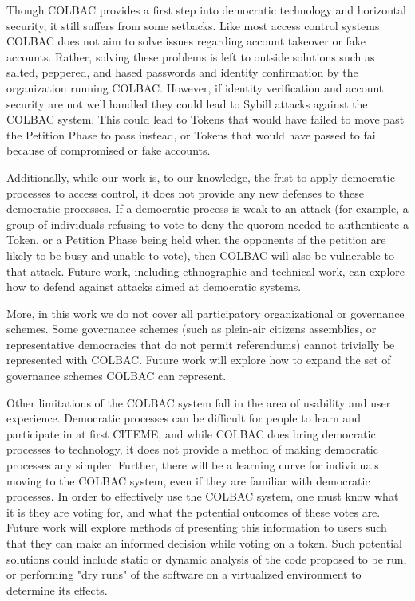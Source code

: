Though COLBAC provides a first step into democratic technology and horizontal
security, it still suffers from some setbacks. Like most access control
systems COLBAC does not aim to solve issues regarding account takeover or fake
accounts. Rather, solving these problems is left to outside solutions such as
salted, peppered, and hased passwords and identity confirmation by the
organization running COLBAC. However, if identity verification and account
security are not well handled they could lead to Sybill attacks against the
COLBAC system. This could lead to Tokens that would have failed to move past the
Petition Phase to pass instead, or Tokens that would have passed to fail because
of compromised or fake accounts. 

Additionally, while our work is, to our knowledge, the frist to apply democratic
processes to access control, it does not provide any new defenses to these
democratic processes. If a democratic process is weak to an attack (for example,
a group of individuals refusing to vote to deny the quorom needed to
authenticate a Token, or a Petition Phase being held when the opponents of the
petition are likely to be busy and unable to vote), then COLBAC will also be
vulnerable to that attack. Future work, including ethnographic and technical
work, can explore how to defend against attacks aimed at democratic systems.

More, in this work we do not cover all participatory organizational or
governance schemes. Some governance schemes (such as plein-air citizens
assemblies, or representative democracies that do not permit referendums) cannot
trivially be represented with COLBAC. Future work will explore how to expand the
set of governance schemes COLBAC can represent.

Other limitations of the COLBAC system fall in the area of usability and user
experience. Democratic processes can be difficult for people to learn and
participate in at first CITEME, and while COLBAC does bring democratic processes
to technology, it does not provide a method of making democratic processes any
simpler. Further, there will be a learning curve for individuals moving to the
COLBAC system, even if they are familiar with democratic processes. In order to
effectively use the COLBAC system, one must know what it is they are voting for,
and what the potential outcomes of these votes are. Future work will explore
methods of presenting this information to users such that they can make an
informed decision while voting on a token. Such potential solutions could
include static or dynamic analysis of the code proposed to be run, or performing
"dry runs" of the software on a virtualized environment to determine its
effects.

